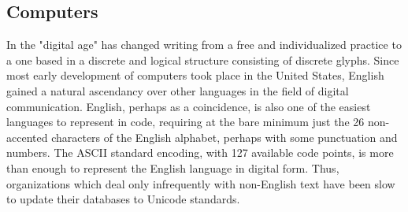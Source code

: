 \subsection{Computers}

In the "digital age" has changed writing from a free and individualized practice
to a one based in a discrete and logical structure consisting of discrete
glyphs. Since most early development of computers took place in the United
States, English gained a natural ascendancy over other languages in the field of
digital communication. English, perhaps as a coincidence, is also one of the
easiest languages to represent in code, requiring at the bare minimum just the
26 non-accented characters of the English alphabet, perhaps with some
punctuation and numbers. The ASCII standard encoding, with 127 available code
points, is more than enough to represent the English language in digital form.
Thus, organizations which deal only infrequently with non-English text have been
slow to update their databases to Unicode standards.
